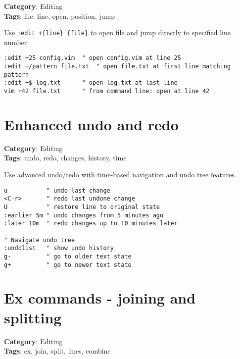 {{{{\textbf{Category}: Editing\\ \textbf{Tags}: file, line, open, position, jump
\vspace{0.5cm}

Use {\footnotesize \Verb§:edit +{line} {file}§} to open file and jump directly to specified line number.

\begin{Exa*}{}
\begin{Verbatim}[fontsize=\footnotesize, breaklines, breakanywhere]
:edit +25 config.vim  " open config.vim at line 25
:edit +/pattern file.txt  " open file.txt at first line matching pattern
:edit +$ log.txt      " open log.txt at last line
vim +42 file.txt      " from command line: open at line 42
\end{Verbatim}
\end{Exa*}

\section{Enhanced undo and redo}

\textbf{Category}: Editing\\ \textbf{Tags}: undo, redo, changes, history, time
\vspace{0.5cm}

Use advanced undo/redo with time-based navigation and undo tree features.

\begin{Exa*}{}
\begin{Verbatim}[fontsize=\footnotesize, breaklines, breakanywhere]
u           " undo last change
<C-r>       " redo last undone change
U           " restore line to original state
:earlier 5m " undo changes from 5 minutes ago
:later 10m  " redo changes up to 10 minutes later

" Navigate undo tree
:undolist   " show undo history
g-          " go to older text state
g+          " go to newer text state
\end{Verbatim}
\end{Exa*}

\section{Ex commands - joining and splitting}

\textbf{Category}: Editing\\ \textbf{Tags}: ex, join, split, lines, combine
\vspace{0.5cm}

}}}}
